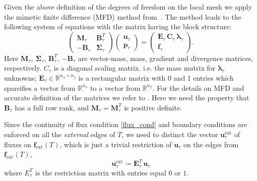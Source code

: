 \documentclass[12pt]{article}
\newcommand{\vect}[1]{\boldsymbol{\mathbf{#1}}}
\newcommand{\bmesh}{{\vect{\mathcal T}}}
\newcommand{\mmesh}{{\vect{\mathcal \tau}}}
\newcommand{\mfaces}[1][]{{\vect{ f}_{\text{#1}}}}
\begin{document}

	
Given the above definition of the degrees of freedom on the local mesh we apply the mimetic finite difference (MFD) method from~\cite{lipnikov2014mimetic}. The method leads to the following system of equations with the matrix having the block structure:
	\begin{equation}\label{local}
		\begin{pmatrix}
			\vect M_\mmesh & \vect B^T_\mmesh \\
			-\vect B_\mmesh & \vect \Sigma_\mmesh
		\end{pmatrix}
		\begin{pmatrix}
			{\vect u}_\mmesh \\
			{\vect p}_\mmesh
		\end{pmatrix}
		=
		\begin{pmatrix}
			\vect E_\mmesh\,\vect C_\mmesh\,{\vect \lambda}_\mmesh \\
			{\vect f}_\mmesh
		\end{pmatrix}.
	\end{equation}
Here $\vect M_\mmesh,~\vect\Sigma_\mmesh$, $\vect B^T_\mmesh$, $-\vect B_\mmesh$ are vector-mass, mass, gradient and divergence matrices, respectively.
$C_\mmesh$ is a diagonal scaling matrix. i.e. the mass matrix for ${\vect \lambda}_\mmesh$ unknowns;
$\vect E_\mmesh \in \mathbb{R}^{n_{\lambda}\times n_f} $ is a rectangular matrix with 0 and 1 entries which sparsifies a vector from  $\mathbb{R}^{n_{\lambda}}$
to a vector from  $\mathbb{R}^{n_{f}}$.
For the details on MFD and accurate definition of the matrices we refer to \cite{lipnikov2014mimetic,MFDbook}.
Here we need the property that  $\vect B_\mmesh$ has a full row rank, and $\vect M_\mmesh = \vect M^T_\mmesh$ is positive definite.


Since the continuity of flux condition \eqref{flux_cond} and boundary conditions are enforced on all the \emph{external} edges of $T$, we need to distinct the vector ${\vect u}^\text{ext}_\mmesh$ of fluxes on $\mfaces[ext](T)$, which is just a trivial restriction of ${\vect u}_\mmesh$ on the edges  from $\mfaces[ext](T)$,
	\begin{equation}\label{system_mini}
		{\vect u}^\text{ext}_\mmesh \coloneqq \vect E_\mmesh^T\,{\vect u}_\mmesh
	\end{equation}
where $E_\mmesh^T$ is the restriction matrix with entries equal $0$ or $1$.
\end{document}
